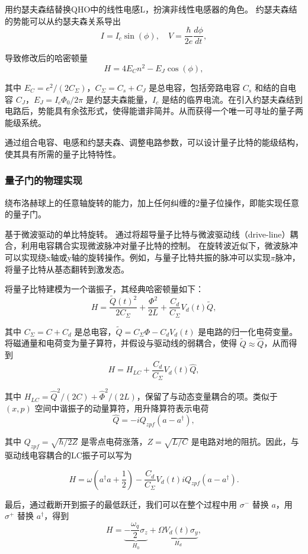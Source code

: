 用约瑟夫森结替换QHO中的线性电感L，扮演非线性电感器的角色。
约瑟夫森结的势能可以从约瑟夫森关系导出
\[
I = I_c \sin(\phi), \quad V = \frac{\hbar}{2e} \frac{d\phi}{dt},
\]

导致修改后的哈密顿量
\[
H = 4E_C n^2 - E_J \cos(\phi),
\]

其中 $E_C = e^2/(2C_\Sigma)$，$C_\Sigma = C_s + C_J$ 是总电容，包括旁路电容 $C_s$ 和结的自电容 $C_J$，$E_J = I_c \Phi_0/2\pi$ 是约瑟夫森能量，$I_c$ 是结的临界电流。在引入约瑟夫森结到电路后，势能具有余弦形式，使得能谱非简并。从而获得一个唯一可寻址的量子两能级系统。

通过组合电容、电感和约瑟夫森、调整电路参数，可以设计量子比特的能级结构，使其具有所需的量子比特特性。
\subsubsection{量子门的物理实现}
绕布洛赫球上的任意轴旋转的能力，加上任何纠缠的2量子位操作，即能实现任意的量子门。


基于微波驱动的单比特旋转。
通过将超导量子比特与微波驱动线（drive-line）耦合，利用电容耦合实现微波脉冲对量子比特的控制。
在旋转波近似下，微波脉冲可以实现绕x轴或y轴的旋转操作。例如，与量子比特共振的脉冲可以实现$\pi$脉冲，将量子比特从基态翻转到激发态。

将量子比特建模为一个谐振子，其经典哈密顿量如下：
\[
H = \frac{\tilde{Q}(t)^2}{2C_\Sigma} + \frac{\Phi^2}{2L} + \frac{C_d}{C_\Sigma} V_d(t) \tilde{Q}, \tag{74}
\]

其中 $C_\Sigma = C + C_d$ 是总电容，$\tilde{Q} = C_\Sigma \Phi - C_d V_d(t)$ 是电路的归一化电荷变量。将磁通量和电荷变为量子算符，并假设与驱动线的弱耦合，使得 $\tilde{Q} \approx \hat{Q}$，从而得到
\[
H = H_{LC} + \frac{C_d}{C_\Sigma} V_d(t) \hat{Q}, \tag{75}
\]

其中 $H_{LC} = \hat{Q}^2/(2C) + \hat{\Phi}^2/(2L)$，保留了与动态变量耦合的项。类似于 $(x, p)$ 空间中谐振子的动量算符，用升降算符表示电荷
\[
\hat{Q} = -i Q_{zpf} (a - a^\dagger), \tag{76}
\]

其中 $Q_{zpf} = \sqrt{\hbar/2Z}$ 是零点电荷涨落，$Z = \sqrt{L/C}$ 是电路对地的阻抗。因此，与驱动线电容耦合的LC振子可以写为

\[
H = \omega \left(a^\dagger a + \frac{1}{2}\right) - \frac{C_d}{C_\Sigma} V_d(t) i Q_{zpf} (a - a^\dagger). \tag{777}
\]

最后，通过截断开到振子的最低跃迁，我们可以在整个过程中用 $\sigma^-$ 替换 $a$，用 $\sigma^+$ 替换 $a^\dagger$，得到
\[
H = \underbrace{-\frac{\omega_q}{2} \sigma_z}_{H_0} + \underbrace{\Omega V_d(t) \sigma_y}_{H_d}, \tag{78}
\]

